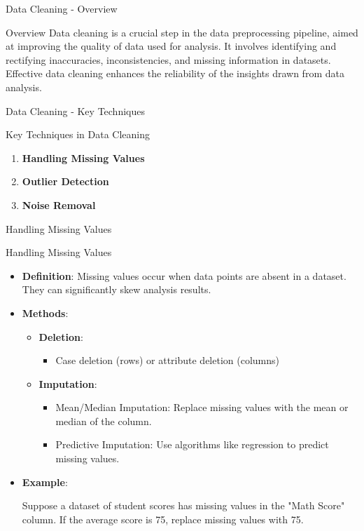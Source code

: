 \documentclass[aspectratio=169]{beamer}
\begin{document}
\begin{frame}[fragile]{Data Cleaning - Overview}
  \begin{block}{Overview}
    Data cleaning is a crucial step in the data preprocessing pipeline, aimed at improving the quality of data used for analysis. It involves identifying and rectifying inaccuracies, inconsistencies, and missing information in datasets. Effective data cleaning enhances the reliability of the insights drawn from data analysis.
  \end{block}
\end{frame}

\begin{frame}[fragile]{Data Cleaning - Key Techniques}
  \begin{block}{Key Techniques in Data Cleaning}
    \begin{enumerate}
      \item \textbf{Handling Missing Values}
      \item \textbf{Outlier Detection}
      \item \textbf{Noise Removal}
    \end{enumerate}
  \end{block}
\end{frame}

\begin{frame}[fragile]{Handling Missing Values}
  \begin{block}{Handling Missing Values}
    \begin{itemize}
      \item \textbf{Definition}: Missing values occur when data points are absent in a dataset. They can significantly skew analysis results.
      \item \textbf{Methods}:
        \begin{itemize}
          \item \textbf{Deletion}:
            \begin{itemize}
              \item Case deletion (rows) or attribute deletion (columns)
            \end{itemize}
          \item \textbf{Imputation}:
            \begin{itemize}
              \item Mean/Median Imputation: Replace missing values with the mean or median of the column.
              \item Predictive Imputation: Use algorithms like regression to predict missing values.
            \end{itemize}
        \end{itemize}
      \item \textbf{Example}: 
        \begin{itemize}
          Suppose a dataset of student scores has missing values in the "Math Score" column. If the average score is 75, replace missing values with 75.
        \end{itemize}
    \end{itemize}
  \end{block}
\end{frame}
\end{document}
